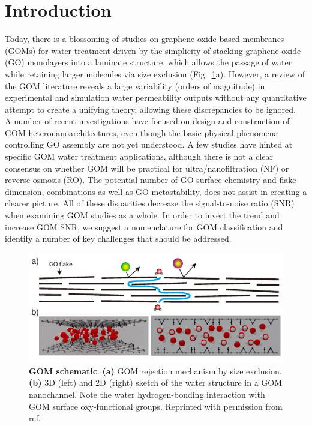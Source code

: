 \justifying
\section{Introduction}
Today, there is a blossoming of studies on graphene oxide-based membranes (GOMs) for water treatment driven by the simplicity of stacking graphene oxide (GO) monolayers into a laminate structure,\cite{mi2014graphene} which allows the passage of water while retaining larger molecules via size exclusion (Fig.~\ref{Fig1_pap2}a).\cite{nair2012unimpeded} However, a review of the GOM literature reveals a large variability (orders of magnitude) in experimental and simulation water permeability outputs without any quantitative attempt to create a unifying theory, allowing these discrepancies to be ignored.\\
A number of recent investigations have focused on design and construction of GOM heteronanoarchitectures, even though the basic physical phenomena controlling GO assembly are not yet understood. A few studies have hinted at specific GOM water treatment applications, although there is not a clear consensus on whether GOM will be practical for ultra/nanofiltration (NF) or reverse osmosis (RO). The potential number of GO surface chemistry\cite{Dreyer2010} and flake dimension, combinations\cite{amadei2016fabrication} as well as GO metastability,\cite{kim2012room} does not assist in creating a clearer picture. All of these disparities decrease the signal-to-noise ratio (SNR) when examining GOM studies as a whole. In order to invert the trend and increase GOM SNR, we suggest a nomenclature for GOM classification and identify a number of key challenges that should be addressed.

\begin{figure}[h!]
  \centering
  \includegraphics[width=5in]{paper2/Fig1.pdf}
  \caption{\textbf{GOM schematic}. \textbf{(a)} GOM rejection mechanism by size exclusion. \textbf{(b)} 3D (left) and 2D (right) sketch of the water structure in a GOM nanochannel. Note the water hydrogen-bonding interaction with GOM surface oxy-functional groups. Reprinted with permission from ref\cite{montessori2017extended}.}
  \label{Fig1_pap2}
\end{figure}
